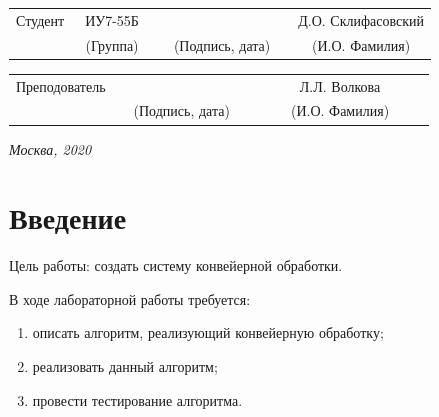 \documentclass[14pt, a4paper]{extarticle}
\begin{document}
\noindent
{}
\\

\noindent
{}
\\

\vspace{1.5cm}
\noindent
\begin{tabular}{l c c c c c}
	Студент      & ~ИУ7-55Б~               & \hspace{2.5cm} & \hspace{2cm}                 & &  Д.О. Склифасовский \\\cline{2-2}\cline{4-4} \cline{6-6} 
	\hspace{3cm} & {\footnotesize(Группа)} &                & {\footnotesize(Подпись, дата)} & & {\footnotesize(И.О. Фамилия)}
\end{tabular}

\noindent
\begin{tabular}{l c c c c}
	Преподователь & \hspace{5cm}   & \hspace{2cm}                 & & ~~~~~~Л.Л. Волкова~~~~~~\\\cline{3-3} \cline{5-5} 
	\hspace{3cm}  &                & {\footnotesize(Подпись, дата)} & & {\footnotesize(И.О. Фамилия)}
\end{tabular}

\vspace{0.6cm}
\begin{center}	
	\vfill
	\large \textit {Москва, 2020}
\end{center}

\thispagestyle {empty}
\pagebreak

\clearpage
\tableofcontents

\clearpage
\section*{Введение}
Цель работы: создать систему конвейерной обработки.\par
В ходе лабораторной работы требуется:
\begin{enumerate}
	\item[1)] описать алгоритм, реализующий конвейерную обработку;
	\item[2)] реализовать данный алгоритм;
	\item[3)] провести тестирование алгоритма.
\end{enumerate}\par
\end{document}
